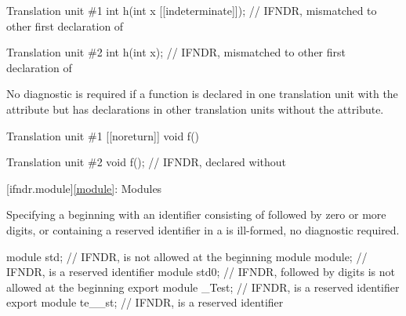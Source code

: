 \pnum
\begin{example}
\begin{codeblocktu}{Translation unit \#1}
int h(int x [[indeterminate]]); // IFNDR, mismatched \tcode{[[indeterminate]]} to other first declaration of 
\end{codeblocktu}
\begin{codeblocktu}{Translation unit \#2}
int h(int x);                   // IFNDR, mismatched \tcode{[[indeterminate]]} to other first declaration of 
\end{codeblocktu}
\end{example}


\pnum
No diagnostic is required if a function is declared
in one translation unit with the  attribute
but has declarations in other translation units
without the attribute.

\pnum
\begin{example}
\begin{codeblocktu}{Translation unit \#1}
[[noreturn]] void f() {}
\end{codeblocktu}
\begin{codeblocktu}{Translation unit \#2}
void f();           // IFNDR, declared without 
\end{codeblocktu}
\end{example}

[ifndr.module]{\ref*{module}: Modules}


\pnum
Specifying a 
beginning with an identifier
consisting of  followed by zero or more digits,
or containing a reserved identifier
in a 
is ill-formed, no diagnostic required.

\pnum
\begin{example}
\begin{codeblock}
module std;             // IFNDR,  is not allowed at the beginning
module module;          // IFNDR,  is a reserved identifier
module std0;            // IFNDR,  followed by digits is not allowed at the beginning
export module _Test;    // IFNDR,  is a reserved identifier
export module te__st;   // IFNDR,  is a reserved identifier
\end{codeblock}
\end{example}

